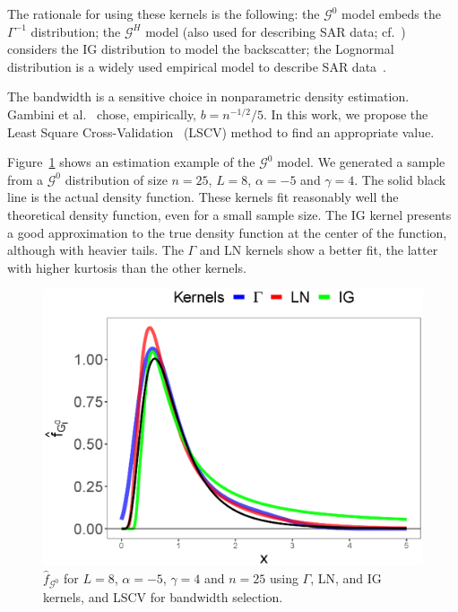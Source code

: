 \documentclass[twocolumn]{svjour3}
\begin{document}
The rationale for using these kernels is the following:
the $\mathcal{G}^0$ model embeds the $\Gamma^{-1}$ distribution;
the $\mathcal{G}^H$ model (also used for describing SAR data; cf.~\cite{PolarimetricSegmentationBSplinesMSSP}) considers the IG distribution to model the backscatter;
the Lognormal distribution is a widely used empirical model to describe SAR data~\cite{Gao2010}. 

The bandwidth is a sensitive choice in nonparametric density estimation. 
Gambini et al.~\cite{gambini2015} chose, empirically, $b=n^{-1/2}/5$. 
In this work, we propose the Least Square Cross-Validation~\cite{Wu1997} (LSCV) method to find an appropriate value.

Figure~\ref{EstimacionLNyGAyIG} shows an estimation example of the $\mathcal{G}^0$ model. 
We generated a sample from a $\mathcal{G}^0$ distribution of size $n=25$, $L = 8$, $\alpha=-5$ and $\gamma=4$. 
The solid black line is the actual density function. 
These kernels fit reasonably well the theoretical density function, even for a small sample size. 
The IG kernel presents a good approximation to the true density function at the center of the function, although with heavier tails. 
The $\Gamma$ and LN kernels show a better fit, the latter with higher kurtosis than the other kernels.

\begin{figure}[hbt]
	\centering
	\includegraphics[width=\linewidth]{../../../Figures/PaperTesis/NucleosGALNyIG.eps}
	\caption{$\widehat{f}_{\mathcal{G}^0}$ for $L=8$, $\alpha=-5$, $\gamma=4$ and $n=25$ using $\Gamma$, LN, and IG kernels, and LSCV for bandwidth selection.}\label{EstimacionLNyGAyIG}
\end{figure}
\end{document}

